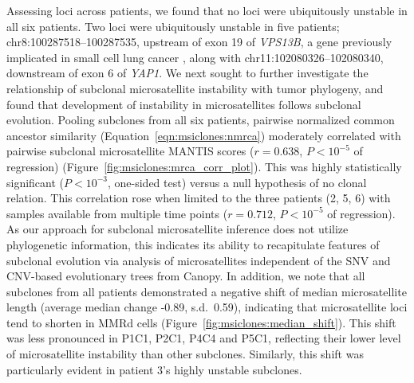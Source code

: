 Assessing loci across patients, we found that no loci were ubiquitously unstable in all six patients. Two loci were ubiquitously unstable in five patients; chr8:100287518--100287535, upstream of exon 19 of \textit{VPS13B}, a gene previously implicated in small cell lung cancer \cite{iwakawa2015}, along with chr11:102080326--102080340, downstream of exon 6 of \textit{YAP1}. We next sought to further investigate the relationship of subclonal microsatellite instability with tumor phylogeny, and found that development of instability in microsatellites follows subclonal evolution. Pooling subclones from all six patients, pairwise normalized common ancestor similarity (Equation~\ref{eqn:msiclones:nmrca}) moderately correlated with pairwise subclonal microsatellite MANTIS scores ($r = 0.638$, $P < 10^{-5}$ of regression) (Figure~\ref{fig:msiclones:mrca_corr_plot}). This was highly statistically significant ($P < 10^{-3}$, one-sided test) versus a null hypothesis of no clonal relation. This correlation rose when limited to the three patients (2, 5, 6) with samples available from multiple time points ($r = 0.712$, $P < 10^{-5}$ of regression). As our approach for subclonal microsatellite inference does not utilize phylogenetic information, this indicates its ability to recapitulate features of subclonal evolution via analysis of microsatellites independent of the SNV and CNV-based evolutionary trees from Canopy. In addition, we note that all subclones from all patients demonstrated a negative shift of median microsatellite length (average median change \mbox{-0.89}, s.d.\ 0.59), indicating that microsatellite loci tend to shorten in MMRd cells (Figure~\ref{fig:msiclones:median_shift}). This shift was less pronounced in P1C1, P2C1, P4C4 and P5C1, reflecting their lower level of microsatellite instability than other subclones. Similarly, this shift was particularly evident in patient 3's highly unstable subclones.

